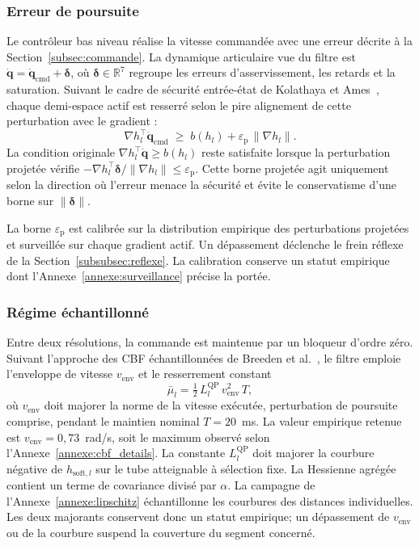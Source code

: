 \subsubsection{Erreur de poursuite}
Le contrôleur bas niveau réalise la vitesse commandée avec une erreur décrite à la Section~\ref{subsec:commande}. La dynamique articulaire vue du filtre est $\dot{\mathbf{q}}=\dot{\mathbf{q}}_{\mathrm{cmd}}+\boldsymbol{\delta}$, où $\boldsymbol{\delta}\in\mathbb{R}^7$ regroupe les erreurs d'asservissement, les retards et la saturation. Suivant le cadre de sécurité entrée-état de Kolathaya et Ames~\cite{Kolathaya2019Input}, chaque demi-espace actif est resserré selon le pire alignement de cette perturbation avec le gradient :
\begin{equation}\label{eq:issf_tightening}
\nabla h_l^{\top}\dot{\mathbf{q}}_{\mathrm{cmd}} \;\geq\; b(h_l) + \varepsilon_{\mathrm{p}}\,\|\nabla h_l\|.
\end{equation}
La condition originale $\nabla h_l^{\top}\dot{\mathbf{q}}\geq b(h_l)$ reste satisfaite lorsque la perturbation projetée vérifie $-\nabla h_l^{\top}\boldsymbol{\delta}/\|\nabla h_l\|\leq\varepsilon_{\mathrm{p}}$. Cette borne projetée agit uniquement selon la direction où l'erreur menace la sécurité et évite le conservatisme d'une borne sur $\|\boldsymbol{\delta}\|$.

La borne $\varepsilon_{\mathrm{p}}$ est calibrée sur la distribution empirique des perturbations projetées et surveillée sur chaque gradient actif. Un dépassement déclenche le frein réflexe de la Section~\ref{subsubsec:reflexe}. La calibration conserve un statut empirique dont l'Annexe~\ref{annexe:surveillance} précise la portée.

\subsubsection{Régime échantillonné}
Entre deux résolutions, la commande est maintenue par un bloqueur d'ordre zéro. Suivant l'approche des CBF échantillonnées de Breeden et al.~\cite{Breeden2022Sampled}, le filtre emploie l'enveloppe de vitesse $v_{\mathrm{env}}$ et le resserrement constant
\begin{equation}\label{eq:sampled_margin}
\bar{\mu}_l = \tfrac{1}{2}\,L_l^{\mathrm{QP}}\,v_{\mathrm{env}}^{2}\,T,
\end{equation}
où $v_{\mathrm{env}}$ doit majorer la norme de la vitesse exécutée, perturbation de poursuite comprise, pendant le maintien nominal $T=20$~ms. La valeur empirique retenue est $v_{\mathrm{env}}=0{,}73$~rad/s, soit le maximum observé selon l'Annexe~\ref{annexe:cbf_details}. La constante $L_l^{\mathrm{QP}}$ doit majorer la courbure négative de $h_{\mathrm{soft},l}$ sur le tube atteignable à sélection fixe. La Hessienne agrégée contient un terme de covariance divisé par $\alpha$. La campagne de l'Annexe~\ref{annexe:lipschitz} échantillonne les courbures des distances individuelles. Les deux majorants conservent donc un statut empirique; un dépassement de $v_{\mathrm{env}}$ ou de la courbure suspend la couverture du segment concerné.


